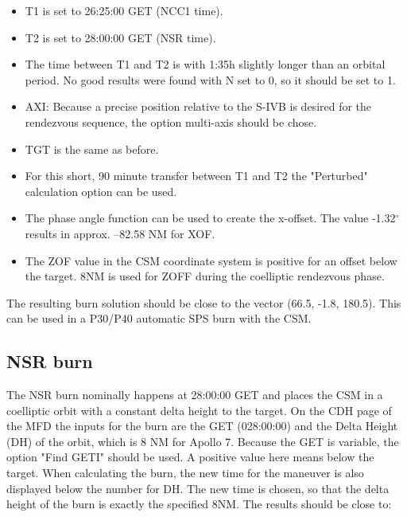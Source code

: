 \documentclass[11pt]{article} %
\begin{document}
\begin{itemize}
	\item{T1 is set to 26:25:00 GET (NCC1 time).}
	\item{T2 is set to 28:00:00 GET (NSR time).}
	\item{The time between T1 and T2 is with 1:35h slightly longer than an orbital period. No good results were found with N set to 0, so it should be set to 1.}
	\item{AXI: Because a precise position relative to the S-IVB is desired for the rendezvous sequence, the option multi-axis should be chose.}
	\item{TGT is  the same as before.}
	\item{For this short, 90 minute transfer between T1 and T2 the "Perturbed" calculation option can be used.}
	\item{The phase angle function can be used to create the x-offset. The value -1.32$^{\circ}$ results in approx. --82.58 NM for XOF.}
	\item{The ZOF value in the CSM coordinate system is positive for an offset below the target. 8NM is used for ZOFF during the coelliptic rendezvous phase.}
\end{itemize}

The resulting burn solution should be close to the vector (66.5, -1.8, 180.5). This can be used in a P30/P40 automatic SPS burn with the CSM.



\subsection{NSR burn}

The NSR burn nominally happens at 28:00:00 GET and places the CSM in a coelliptic orbit with a constant delta height to the target. On the CDH page of the MFD the inputs for the burn are the GET (028:00:00) and the Delta Height (DH) of the orbit, which is 8 NM for Apollo 7. Because the GET is variable, the option "Find GETI" should be used. A positive value here means below the target. When calculating the burn, the new time for the maneuver is also displayed below the number for DH. The new time is chosen, so that the delta height of the burn is exactly the specified 8NM. The results should be close to:
\end{document}
